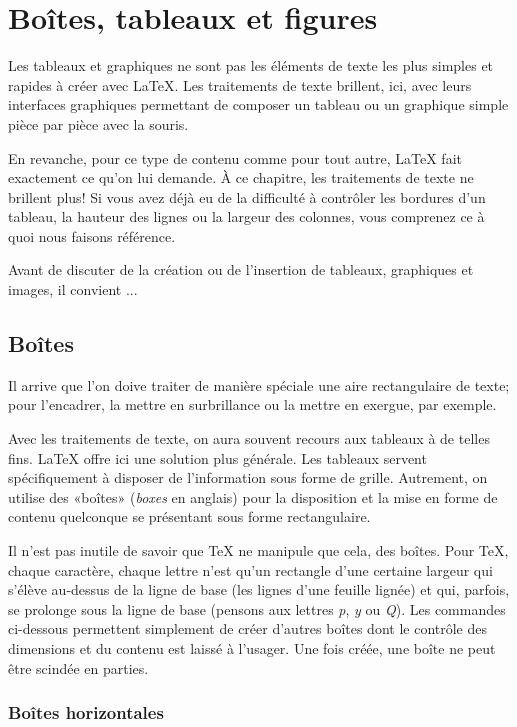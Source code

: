 \chapter{Boîtes, tableaux et figures}
\label{chap:tableaux}

Les tableaux et graphiques ne sont pas les éléments de texte les plus
simples et rapides à créer avec {\LaTeX}. Les traitements de texte
brillent, ici, avec leurs interfaces graphiques permettant de composer
un tableau ou un graphique simple pièce par pièce avec la souris.

En revanche, pour ce type de contenu comme pour tout autre, {\LaTeX}
fait exactement ce qu'on lui demande. À ce chapitre, les traitements
de texte ne brillent plus! Si vous avez déjà eu de la difficulté à
contrôler les bordures d'un tableau, la hauteur des lignes ou la
largeur des colonnes, vous comprenez ce à quoi nous faisons référence.

Avant de discuter de la création ou de l'insertion de tableaux,
graphiques et images, il convient ...


\section{Boîtes}
\label{sec:tableaux:boites}

Il arrive que l'on doive traiter de manière spéciale une aire
rectangulaire de texte; pour l'encadrer, la mettre en surbrillance ou
la mettre en exergue, par exemple.

Avec les traitements de texte, on aura souvent recours aux tableaux à
de telles fins. {\LaTeX} offre ici une solution plus générale. Les
tableaux servent spécifiquement à disposer de l'information sous forme
de grille. Autrement, on utilise des «boîtes» (\emph{boxes} en
anglais) pour la disposition et la mise en forme de contenu quelconque
se présentant sous forme rectangulaire.

Il n'est pas inutile de savoir que {\TeX} ne manipule que cela, des
boîtes. Pour {\TeX}, chaque caractère, chaque lettre n'est qu'un
rectangle d'une certaine largeur qui s'élève au-dessus de la ligne de
base (les lignes d'une feuille lignée) et qui, parfois, se prolonge
sous la ligne de base (pensons aux lettres \emph{p}, \emph{y} ou
\emph{Q}). Les commandes ci-dessous permettent simplement de créer
d'autres boîtes dont le contrôle des dimensions et du contenu est
laissé à l'usager. Une fois créée, une boîte ne peut être scindée en
parties.

\subsection{Boîtes horizontales}

